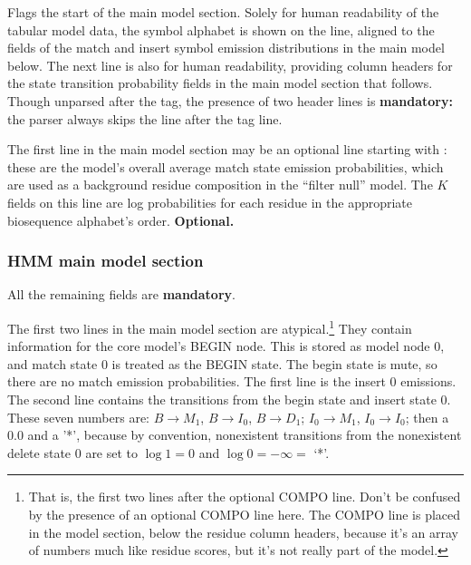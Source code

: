 \begin{sreitems}{}
\item [\emprog{HMM }] Flags the start of the main model
section. Solely for human readability of the tabular model data, the
symbol alphabet is shown on the  line, aligned to the fields
of the match and insert symbol emission distributions in the main
model below. The next line is also for human readability, providing
column headers for the state transition probability fields in the main
model section that follows. Though unparsed after the  tag,
the presence of two header lines is \textbf{mandatory:} the parser
always skips the line after the  tag line.

\item [\emprog{COMPO <f>*K}] The first line in the main model section
may be an optional line starting with : these are the
model's overall average match state emission probabilities, which are
used as a background residue composition in the ``filter null''
model. The $K$ fields on this line are log probabilities for each
residue in the appropriate biosequence alphabet's
order. \textbf{Optional.}

\end{sreitems}

\subsubsection{HMM main model section}

All the remaining fields are \textbf{mandatory}.

The first two lines in the main model section are
atypical.\footnote{That is, the first two lines after the optional
  COMPO line. Don't be confused by the presence of an optional COMPO
  line here. The COMPO line is placed in the model section, below the
  residue column headers, because it's an array of numbers much like
  residue scores, but it's not really part of the model.}  They
contain information for the core model's BEGIN node. This is stored as
model node 0, and match state 0 is treated as the BEGIN state.  The
begin state is mute, so there are no match emission probabilities. The
first line is the insert 0 emissions. The second line contains the
transitions from the begin state and insert state 0.  These seven
numbers are: $B \rightarrow M_1$, $B \rightarrow I_0$, $B \rightarrow
D_1$; $I_0 \rightarrow M_1$, $I_0 \rightarrow I_0$; then a 0.0 and a
'*', because by convention, nonexistent transitions from the
nonexistent delete state 0 are set to $\log 1 = 0$ and $\log 0 =
-\infty = $ `*'.

